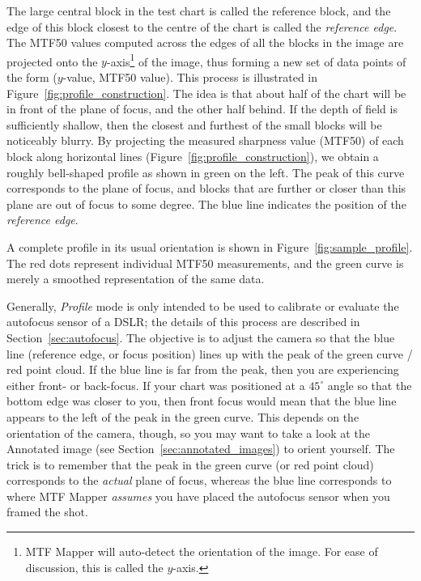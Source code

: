 \documentclass[a4paper]{article}
\begin{document}
The large central block in the test chart is called the reference block, and the edge of this block closest to the
centre of the chart is called the \emph{reference edge}.
The MTF50 values computed across the edges of all the blocks in the image
are projected onto the $y$-axis\footnote{MTF Mapper will auto-detect the
orientation of the image. For ease of discussion, this is called the
$y$-axis.} of the image, thus forming a new set of data
points of the form ($y$-value, MTF50 value). This process is illustrated in
Figure~\ref{fig:profile_construction}. The idea is that about half of the
chart will be in front of the plane of focus, and the other half behind. If
the depth of field is sufficiently shallow, then the closest and furthest of
the small blocks will be noticeably blurry. By projecting the measured
sharpness value (MTF50) of each block along horizontal lines
(Figure~\ref{fig:profile_construction}), we obtain a roughly bell-shaped
profile as shown in green on the left. The peak of this curve corresponds to the plane
of focus, and blocks that are further or closer than this plane are out of
focus to some degree. The blue line indicates the position of the
\emph{reference edge}.

A complete profile in its usual orientation is shown in 
Figure~\ref{fig:sample_profile}. The red dots represent individual MTF50
measurements, and the green curve is merely a smoothed representation of the
same data.

Generally, \emph{Profile} mode is only intended to be used to calibrate or
evaluate the autofocus sensor of a DSLR; the details of this process are
described in Section~\ref{sec:autofocus}. The objective is to adjust the
camera so that the blue line (reference edge, or focus position) lines up
with the peak of the green curve / red point cloud. If the blue line is far
from the peak, then you are experiencing either front- or back-focus. If
your chart was positioned at a $45^\circ$ angle so that the bottom edge 
was closer to you, then front focus would mean that the blue line appears to
the left of the peak in the green curve. This depends on the orientation of
the camera, though, so you may want to take a look at the \textsf{Annotated
image} (see Section~\ref{sec:annotated_images}) to orient yourself. The trick is to
remember that the peak in the green curve (or red point cloud) corresponds
to the \emph{actual} plane of focus, whereas the blue line corresponds to
where MTF Mapper \emph{assumes} you have placed the autofocus sensor when you
framed the shot.
\end{document}
